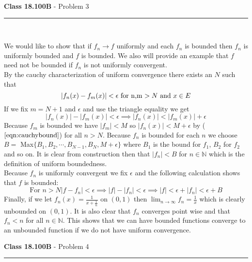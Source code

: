 \documentclass[11pt,reqno]{article}
\begin{document}
\vspace{15pt}
\begin{flushleft} 
\textbf{Class 18.100B} - Problem 3\\
\rule{500pt}{1pt}\\
\end{flushleft} 
We would like to show that if $f_n \to f$ uniformly and each $f_n$ is bounded then $f_n$ is uniformly bounded and $f$ is bounded. We also will provide an example that $f$ need not be bounded if $f_n$ is not uniformly convergent.\\
\indent By the cauchy characterization of uniform convergence there exists an $N$ such that 
\[ | f_n(x) - f_m(x) | < \epsilon \text{ for n,m $ > N$ and $x \in E$} \] 
If we fix $m = N+1$ and $\epsilon$ and use the triangle equality we get 
\begin{equation}
|f_n(x)| - |f_m(x)| < \epsilon \implies |f_n(x)| < |f_m(x)| + \epsilon \label{eqn:cauchybound}
\end{equation}
Because $f_m$ is bounded we have $|f_m| < M$ so $|f_n(x)| < M + \epsilon$ by ($\ref{eqn:cauchybound}$) for all $n > N$. Because $f_n$ is bounded for each $n$ we choose $B =$ Max$\{B_1,B_2,\cdots,B_{N-1},B_{N},M + \epsilon\}$ where $B_1$ is the bound for $f_1$, $B_2$ for $f_2$ and so on. It is clear from construction then that $|f_n| < B$ for $n \in \mathbb{N}$ which is the definition of uniform boundedness. \\ 
\indent Because $f_n$ is uniformly convergent we fix $\epsilon$ and the following calculation shows that $f$ is bounded:
\[ \text{For $n > N $} |f-f_n| < \epsilon \implies |f|-|f_n| < \epsilon \implies |f| < \epsilon + |f_n| < \epsilon + B \]
\indent Finally, if we let $f_n(x) = \frac{1}{x + \frac{1}{n}}$ on $(0,1)$ then $\lim_{n \to \infty} f_n = \frac{1}{x}$ which is clearly unbounded on $(0,1)$. It is also clear that $f_n$ converges point wise and that $f_n < n$ for all $n \in \mathbb{N}$. This shows that we can have bounded functions converge to an unbounded function if we do not have uniform convergence.
 
\vspace{15pt}
\begin{flushleft} 
\textbf{Class 18.100B} - Problem 4\\
\rule{500pt}{1pt}\\
\end{flushleft} 
\end{document}

